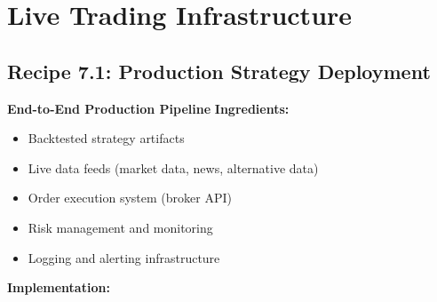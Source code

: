 \documentclass[11pt,letterpaper,openany]{book}
\begin{document}
\section{Live Trading Infrastructure}

\subsection{Recipe 7.1: Production Strategy Deployment}

\textbf{End-to-End Production Pipeline}
\textbf{Ingredients:}
\begin{itemize}
    \item Backtested strategy artifacts
    \item Live data feeds (market data, news, alternative data)
    \item Order execution system (broker API)
    \item Risk management and monitoring
    \item Logging and alerting infrastructure
\end{itemize}
\textbf{Implementation:}
\end{document}
